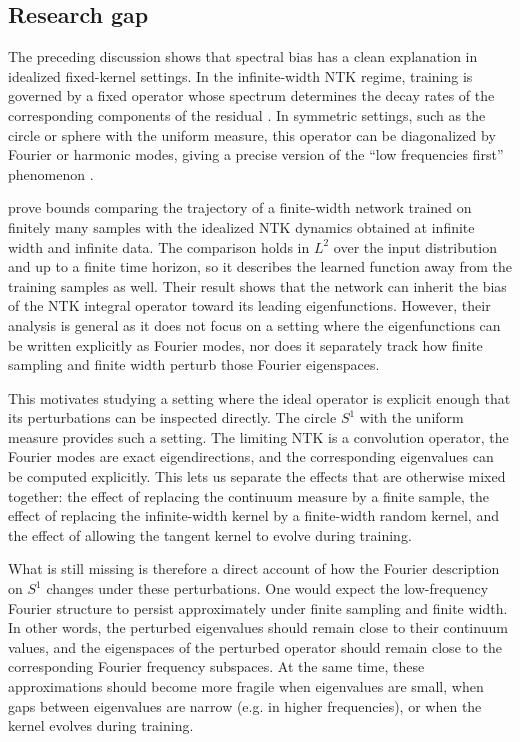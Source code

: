 \begin{revblock}
	\section{Research gap}\label{sec:research-gap}

	The preceding discussion shows that spectral bias has a clean explanation in
	idealized fixed-kernel settings. In the infinite-width NTK regime, training is
	governed by a fixed operator whose spectrum determines the decay rates of the
	corresponding components of the residual
	\citep{jacot2018ntk,cao2020understandingspectralbiasdeep}. In symmetric
	settings, such as the circle or sphere with the uniform measure, this operator
	can be diagonalized by Fourier or harmonic modes, giving a precise version of
	the ``low frequencies first'' phenomenon
	\citep{basri2019convergence,basri2020frequencybiasneuralnetworks,
		bietti2019inductivebiasneuraltangent}.

	\citet{bowman2022spectralbiasoutsidetraining} prove bounds comparing the
	trajectory of a finite-width network trained on finitely many samples with the
	idealized NTK dynamics obtained at infinite width and infinite data. The
	comparison holds in \(L^2\) over the input distribution and up to a finite time
	horizon, so it describes the learned function away from the training samples as
	well. Their result shows that the network can inherit the bias of the NTK
	integral operator toward its leading eigenfunctions. However, their analysis is
	general as it does not focus on a setting where the eigenfunctions can be written
	explicitly as Fourier modes, nor does it separately track how finite sampling
	and finite width perturb those Fourier eigenspaces.

	This motivates studying a setting where the ideal operator is explicit enough
	that its perturbations can be inspected directly. The circle \(S^1\) with the
	uniform measure provides such a setting. The limiting NTK is a convolution
	operator, the Fourier modes are exact eigendirections, and the corresponding
	eigenvalues can be computed explicitly. This lets us separate the effects that
	are otherwise mixed together: the effect of replacing the continuum measure by
	a finite sample, the effect of replacing the infinite-width kernel by a
	finite-width random kernel, and the effect of allowing the tangent kernel to
	evolve during training.

	What is still missing is therefore a direct account of how the Fourier
	description on \(S^1\) changes under these perturbations.  One would expect the
	low-frequency Fourier structure to persist approximately under finite sampling
	and finite width. In other words, the perturbed eigenvalues should remain close
	to their continuum values, and the eigenspaces of the perturbed operator should
	remain close to the corresponding Fourier frequency subspaces. At the same
	time, these approximations should become more fragile when eigenvalues are
	small, when gaps between eigenvalues are narrow (e.g. in higher frequencies),
	or when the kernel evolves during training.


\end{revblock}
